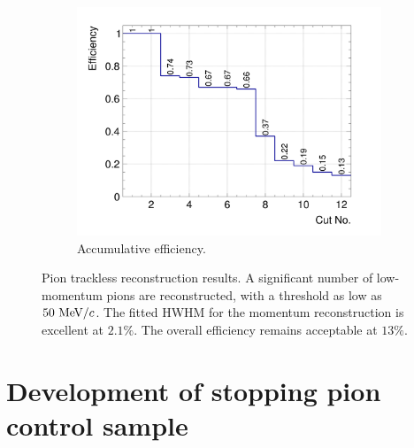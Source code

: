 \begin{figure}
\begin{subfigure}{\trfigwid\textwidth}
                   \label{fig:ppi-res}
              \end{subfigure}
              \begin{subfigure}{\trfigwid\textwidth}
                   \includegraphics[width=\textwidth]{figures/sel/INCL_p_pi_accum_eff_al11.png}
                   \caption{Accumulative efficiency.}
                   \label{fig:tl-accum-eff}
              \end{subfigure}
              \caption{Pion trackless reconstruction results. A significant number of low-momentum pions are reconstructed, with a threshold as low as $50~\textrm{MeV}/c$. The fitted HWHM for the momentum reconstruction is excellent at $2.1\%$. The overall efficiency remains acceptable at $13\%$.}
              \label{fig:piTLres}
           \end{figure}


    \section{Development of stopping pion control sample}

